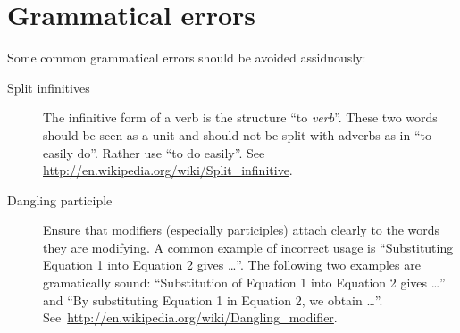 \documentclass[a5paper, 10pt]{article}
\begin{document}





%

\section{Grammatical errors}
\label{app:grammatical-errors}

Some common grammatical errors should be avoided assiduously:

\begin{description}
\item[Split infinitives] The infinitive form of a verb is the
  structure ``to \emph{verb}''.  These two words should be seen as a
  unit and should not be split with adverbs as in ``to easily do''.
  Rather use ``to do easily''.  See
  \url{http://en.wikipedia.org/wiki/Split_infinitive}.
\item[Dangling participle] Ensure that modifiers (especially
  participles) attach clearly to the words they are modifying.  A
  common example of incorrect usage is ``Substituting Equation 1 into
  Equation 2 gives \dots''.  The following two examples are gramatically
  sound: ``Substitution of Equation 1 into Equation 2 gives \dots''
  and ``By substituting Equation 1 in Equation 2, we obtain \dots''.
  See~\url{http://en.wikipedia.org/wiki/Dangling_modifier}.
\end{description}
\end{document}
